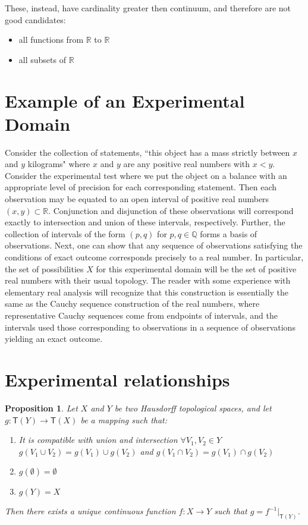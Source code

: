 \documentclass[review]{elsarticle}
\theoremstyle{plain}%
\newtheorem{prop}[thm]{Proposition}
\theoremstyle{definition}
\theoremstyle{remark}
\begin{document}
These, instead, have cardinality greater then continuum, and therefore are not good candidates:
\begin{itemize}
	\item all functions from $\mathbb{R}$ to $\mathbb{R}$
	\item all subsets of $\mathbb{R}$
\end{itemize}




\section{Example of an Experimental Domain}

Consider the collection of statements, ``this object has a mass strictly between $x$ and $y$ kilograms" where $x$ and $y$ are any positive real numbers with $x<y$. Consider the experimental test where we put the object on a balance with an appropriate level of precision for each corresponding statement. Then each observation may be equated to an open interval of positive real numbers $(x,y)\subset\mathbb{R}$. Conjunction and disjunction of these observations will correspond exactly to intersection and union of these intervals, respectively. Further, the collection of intervals of the form $(p,q)$ for $p,q\in\mathbb{Q}$ forms a basis of observations. Next, one can show that any sequence of observations satisfying the conditions of exact outcome corresponds precisely to a real number. In particular, the set of possibilities $X$ for this experimental domain will be the set of positive real numbers with their usual topology. The reader with some experience with elementary real analysis will recognize that this construction is essentially the same as the Cauchy sequence construction of the real numbers, where representative Cauchy sequences come from endpoints of intervals, and the intervals used those corresponding to observations in a sequence of observations yielding an exact outcome. 





\section{Experimental relationships}



\begin{prop}
	\label{setfunctions}
	Let $X$ and $Y$ be two Hausdorff topological spaces, and let $g: \mathsf{T}(Y) \rightarrow \mathsf{T}(X)$ be a mapping such that:
	\begin{enumerate}
		\item It is compatible with union and intersection $\forall V_1, V_2 \in Y$ $g(V_1 \cup V_2)=g(V_1)\cup g(V_2)$ and $g(V_1 \cap V_2)=g(V_1)\cap g(V_2)$
		\item $g(\emptyset) = \emptyset$
		\item $g(Y) = X$
	\end{enumerate}
	Then there exists a unique continuous function $f: X \rightarrow Y$ such that $g = f^{-1} |_{\mathsf{T}(Y)}$.
\end{prop}
\end{document}
